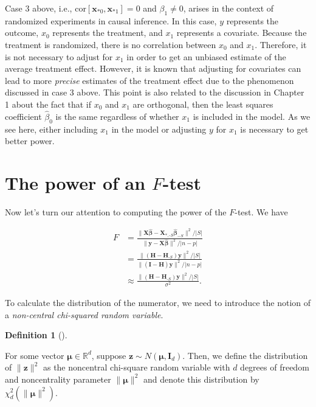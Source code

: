 \documentclass[
  11pt,
  letterpaper,
  oneside]{book}
\theoremstyle{plain}
\theoremstyle{plain}
\theoremstyle{definition}
\newtheorem{definition}{Definition}[chapter]
\theoremstyle{definition}
\theoremstyle{plain}
\theoremstyle{remark}
\begin{document}
Case 3 above, i.e.,
\(\text{cor}[\boldsymbol{x}_{*0}, \boldsymbol{x}_{*1}] = 0\) and
\(\beta_1 \neq 0\), arises in the context of randomized experiments in
causal inference. In this case, \(y\) represents the outcome, \(x_0\)
represents the treatment, and \(x_1\) represents a covariate. Because
the treatment is randomized, there is no correlation between \(x_0\) and
\(x_1\). Therefore, it is not necessary to adjust for \(x_1\) in order
to get an unbiased estimate of the average treatment effect. However, it
is known that adjusting for covariates can lead to more \emph{precise}
estimates of the treatment effect due to the phenomenon discussed in
case 3 above. This point is also related to the discussion in Chapter 1
about the fact that if \(x_0\) and \(x_1\) are orthogonal, then the
least squares coefficient \(\widehat \beta_0\) is the same regardless of
whether \(x_1\) is included in the model. As we see here, either
including \(x_1\) in the model or adjusting \(y\) for \(x_1\) is
necessary to get better power.

\hypertarget{the-power-of-an-f-test}{%
\section{\texorpdfstring{The power of an
\(F\)-test}{The power of an F-test}}\label{the-power-of-an-f-test}}

Now let's turn our attention to computing the power of the \(F\)-test.
We have

\[
\begin{split}
F &= \frac{\|\boldsymbol{X}\boldsymbol{\widehat \beta} - \boldsymbol{X}_{*, \text{-}S}\boldsymbol{\widehat \beta}_{-S}\|^2/|S|}{\|\boldsymbol{y} - \boldsymbol{X}\boldsymbol{\widehat \beta}\|^2/|n-p|} \\
&= \frac{\|(\boldsymbol{H}-\boldsymbol{H}_{\text{-}S}) \boldsymbol{y}\|^2/|S|}{\|(\boldsymbol{I} - \boldsymbol{H})\boldsymbol{y}\|^2/|n-p|} \\
&\approx \frac{\|(\boldsymbol{H}-\boldsymbol{H}_{\text{-}S}) \boldsymbol{y}\|^2/|S|}{\sigma^2}.
\end{split}
\]

To calculate the distribution of the numerator, we need to introduce the
notion of a \emph{non-central chi-squared random variable}.

\begin{definition}[]\protect\hypertarget{def-noncentral-chi-square}{}\label{def-noncentral-chi-square}

For some vector \(\boldsymbol{\mu} \in \mathbb{R}^d\), suppose
\(\boldsymbol{z} \sim N(\boldsymbol{\mu}, \boldsymbol{I}_d)\). Then, we
define the distribution of \(\|\boldsymbol{z}\|^2\) as the noncentral
chi-square random variable with \(d\) degrees of freedom and
noncentrality parameter \(\|\boldsymbol{\mu}\|^2\) and denote this
distribution by \(\chi^2_d(\|\boldsymbol{\mu}\|^2)\).

\end{definition}
\end{document}
